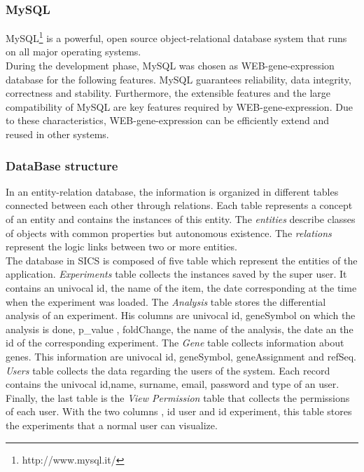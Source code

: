 \documentclass[a4paper]{report}
\begin{document}
\subsubsection{MySQL}

MySQL\footnote{http://www.mysql.it/} is a powerful, open source object-relational database system that runs on all major operating systems.
\\During the development phase, MySQL was chosen as WEB-gene-expression database for the following features. MySQL guarantees reliability, data integrity, correctness and stability. Furthermore, the extensible features and the large compatibility of MySQL are key features required by WEB-gene-expression. Due to these characteristics, WEB-gene-expression can be efficiently extend and reused in other systems.

\subsubsection{DataBase structure}

In an entity-relation database, the information is organized in different tables connected between each other through relations. Each table represents a concept of an entity and contains the instances of this entity. The \emph{entities} describe classes of objects with common properties but autonomous existence. The \emph{relations} represent the logic links between two or more entities.\\
The database in SICS is composed of five table which represent the entities of the application. \emph{Experiments} table collects the instances saved by the super user. It contains an univocal id, the name of the item, the date corresponding at the time when the experiment was loaded. The \emph{Analysis} table stores the differential analysis of an experiment. His columns are	univocal id, geneSymbol on which the analysis is done, p\_value , foldChange, the name of the analysis, the date an the id of the corresponding experiment. 
The \emph{Gene} table collects information about genes. This information are 	univocal id, geneSymbol, geneAssignment and refSeq.
\emph{Users} table collects the data regarding the users of the system. Each record contains the univocal id,name, surname, email, password and type of an user.
 Finally, the last table is the \emph{View Permission} table that collects the permissions of each user. With the two columns , id user and id experiment, this table stores the experiments that a normal user can visualize.\\
\end{document}
